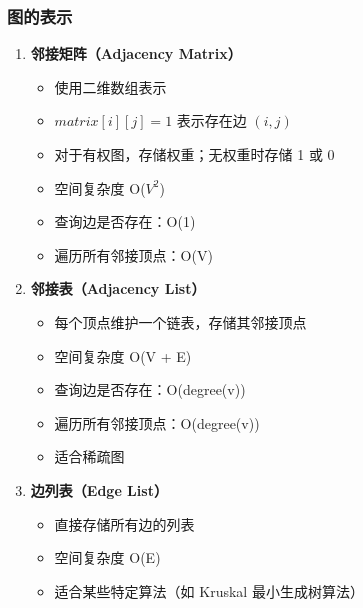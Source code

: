 \subsubsection{图的表示}

\begin{enumerate}
  \item \textbf{邻接矩阵（Adjacency Matrix）}
    \begin{itemize}
      \item 使用二维数组表示
      \item $matrix[i][j] = 1$ 表示存在边 $(i, j)$
      \item 对于有权图，存储权重；无权重时存储 1 或 0
      \item 空间复杂度 O($V^2$)
      \item 查询边是否存在：O(1)
      \item 遍历所有邻接顶点：O(V)
    \end{itemize}

  \item \textbf{邻接表（Adjacency List）}
    \begin{itemize}
      \item 每个顶点维护一个链表，存储其邻接顶点
      \item 空间复杂度 O(V + E)
      \item 查询边是否存在：O(degree(v))
      \item 遍历所有邻接顶点：O(degree(v))
      \item 适合稀疏图
    \end{itemize}

  \item \textbf{边列表（Edge List）}
    \begin{itemize}
      \item 直接存储所有边的列表
      \item 空间复杂度 O(E)
      \item 适合某些特定算法（如 Kruskal 最小生成树算法）
    \end{itemize}
\end{enumerate}

